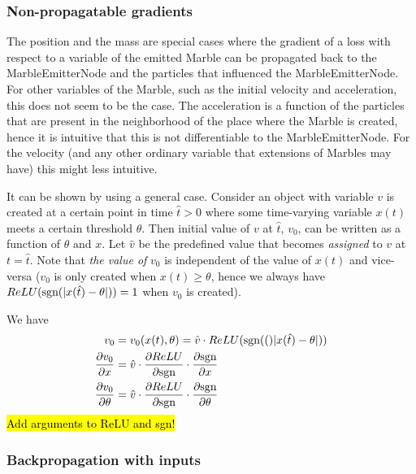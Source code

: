 \subsubsection{Non-propagatable gradients}

The position and the mass are  special cases where the gradient of a loss with respect to a variable of the emitted Marble can be propagated back to the MarbleEmitterNode and the particles that influenced the MarbleEmitterNode. For other variables of the Marble, such as the initial velocity and acceleration, this does not seem to be the case. The acceleration is a function of the particles that are present in the neighborhood of the place where the Marble is created, hence it is intuitive that this is not differentiable to the MarbleEmitterNode. For the velocity (and any other ordinary variable that extensions of Marbles may have) this might less intuitive.

It can be shown by using a general case. Consider an object with variable $v$ is created at a certain point in time $\hat{t} > 0$ where some time-varying variable $x(t)$ meets a certain threshold $\theta$. Then initial value of $v$ at $\hat{t}$, $v_0$, can be written as a function of $\theta$ and $x$. Let $\hat{v}$ be the predefined value that becomes \textit{assigned} to $v$ at $t = \hat{t}$. Note that \textit{the value of} $v_0$ is independent of the value of $x(t)$ and vice-versa ($v_0$ is only created when $x(t) \geq \theta$, hence we always have $ReLU(\text{sgn}(\lvert x(\hat{t}) - \theta \rvert)) = 1$ when $v_0$ is created).

We have 
\begin{align}
    v_0 &= v_0(x(t), \theta) = \hat{v} \cdot ReLU(\text{sgn}(()\lvert x(\hat{t}) - \theta \rvert)) \\
    \frac{\partial v_0}{\partial x} &= \hat{v} \cdot \frac{\partial ReLU}{\partial \text{sgn}} \cdot \frac{\partial \text{sgn}}{\partial x} \\
    \frac{\partial v_0}{\partial \theta} &= \hat{v} \cdot \frac{\partial ReLU}{\partial \text{sgn}} \cdot \frac{\partial \text{sgn}}{\partial \theta}
\end{align}
\hl{Add arguments to ReLU and sgn!}
\subsubsection{Backpropagation with inputs}




